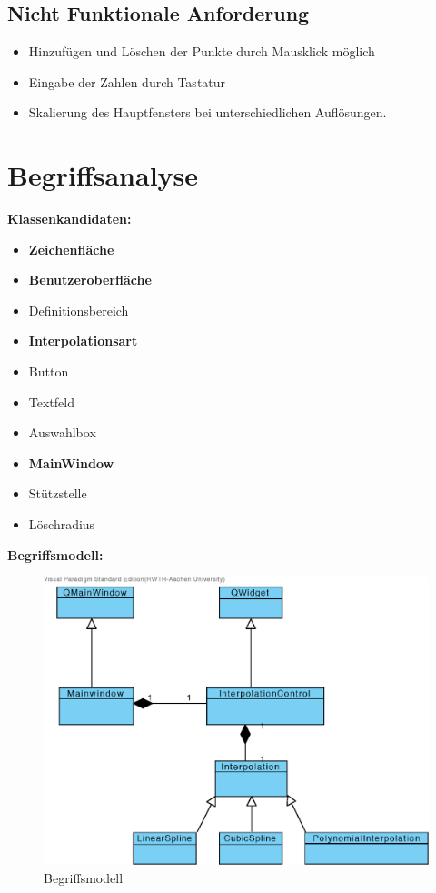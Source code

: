 \subsection{Nicht Funktionale Anforderung}
\begin{itemize}
\item Hinzuf\"ugen und L\"oschen der Punkte durch Mausklick m\"oglich
\item Eingabe der Zahlen durch Tastatur
\item Skalierung des Hauptfensters bei unterschiedlichen Aufl\"osungen.
\end{itemize}


\section{Begriffsanalyse}
\textbf{Klassenkandidaten:}
\begin{itemize}
  \item \textbf{Zeichenfl\"ache}
  \item \textbf{Benutzeroberfl\"ache}
  \item Definitionsbereich
  \item \textbf{Interpolationsart}
  \item Button
  \item Textfeld
  \item Auswahlbox
  \item \textbf{MainWindow}
  \item St\"utzstelle
  \item L\"oschradius
\end{itemize}
\textbf{Begriffsmodell:}

\begin{figure}
\centering
\includegraphics[width=\textwidth]{figures/Begriffsmodel.eps}
\caption{Begriffsmodell}
\end{figure}
